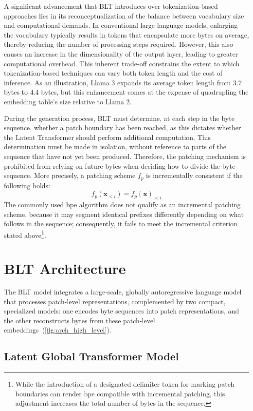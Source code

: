 A significant advancement that {\textsc BLT} introduces over tokenization-based approaches lies in its reconceptualization of the balance between vocabulary size and computational demands. In conventional large language models, enlarging the vocabulary typically results in tokens that encapsulate more bytes on average, thereby reducing the number of processing steps required. However, this also causes an increase in the dimensionality of the output layer, leading to greater computational overhead. This inherent trade-off constrains the extent to which tokenization-based techniques can vary both token length and the cost of inference. As an illustration, Llama 3 expands its average token length from 3.7 bytes to 4.4 bytes, but this enhancement comes at the expense of quadrupling the embedding table's size relative to Llama 2.

During the generation process, {\textsc BLT} must determine, at each step in the byte sequence, whether a patch boundary has been reached, as this dictates whether the Latent Transformer should perform additional computation. This determination must be made in isolation, without reference to parts of the sequence that have not yet been produced. Therefore, the patching mechanism is prohibited from relying on future bytes when deciding how to divide the byte sequence. More precisely, a patching scheme $f_p$ is incrementally consistent if the following holds:
$$f_p(\pmb{x}_{<i}) = f_p(\pmb{x})_{<i}$$
The commonly used bpe algorithm does not qualify as an incremental patching scheme, because it may segment identical prefixes differently depending on what follows in the sequence; consequently, it fails to meet the incremental criterion stated above\footnote{While the introduction of a designated delimiter token for marking patch boundaries can render bpe compatible with incremental patching, this adjustment increases the total number of bytes in the sequence.}.

\section{{\textsc BLT} Architecture}
\label{section:architecture}
The {\textsc BLT} model integrates a large-scale, globally autoregressive language model that processes patch-level representations, complemented by two compact, specialized models: one encodes byte sequences into patch representations, and the other reconstructs bytes from these patch-level embeddings~(\autoref{fig:arch_high_level}).

\subsection{Latent Global Transformer Model}

